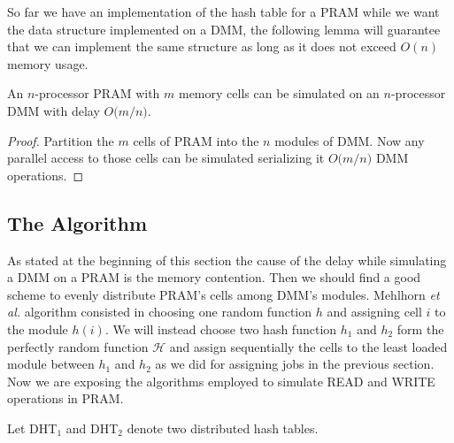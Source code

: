 So far we have an implementation of the hash table for a PRAM while we
want the data structure implemented on a DMM, the following lemma will
guarantee that we can implement the same structure as long as it does not
exceed $O(n)$ memory usage.

\begin{lemma}
  An $n$-processor PRAM with $m$ memory cells can be simulated on an
  $n$-processor DMM with delay $O\bigl(m / n\bigr)$.
\end{lemma}
\begin{proof}
  Partition the $m$ cells of PRAM into the $n$ modules of DMM. Now any parallel
  access to those cells can be simulated serializing it $O\bigl(m / n\bigr)$
  DMM operations.
\end{proof}



\subsection{The Algorithm}
As stated at the beginning of this section the cause of the delay
while simulating a DMM on a PRAM is
the memory contention. Then we should find a good scheme to evenly distribute
PRAM's cells among DMM's modules. Mehlhorn {\em et al.} \cite{art} algorithm
consisted in choosing one random function $h$ and assigning cell $i$ to the
module $h(i)$. We will instead choose two hash function $h_1$ and $h_2$
form the perfectly random function $\mathcal{H}$ and assign sequentially
the cells to the least loaded module between $h_1$ and $h_2$ as we did
for assigning jobs in the previous section. Now we are exposing the
algorithms employed to simulate READ and WRITE operations in PRAM.

Let DHT$_1$ and DHT$_2$ denote two distributed hash tables.

\begin{algorithm}[H]
  \caption{}\label{pseudocode}
  \begin{algorithmic}[1]
       \label{pseudocode_outer}
        \Else
      \EndIf
     \EndFor
    \EndProcedure
       \label{pseudocode_outer}
        \Else
      \EndIf
      \EndFor
    \EndProcedure
  \   
  \end{algorithmic}
\end{algorithm}








